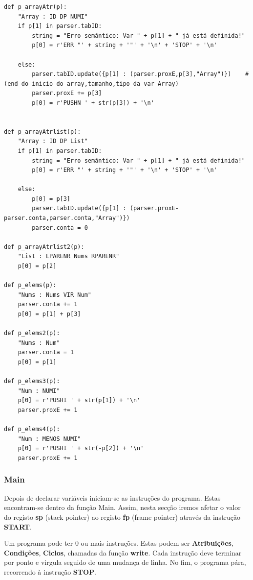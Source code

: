 \documentclass{article}
\begin{document}
\clearpage
\begin{lstlisting}[firstnumber=88]
def p_arrayAtr(p):
    "Array : ID DP NUMI"
    if p[1] in parser.tabID:
        string = "Erro semântico: Var " + p[1] + " já está definida!"
        p[0] = r'ERR "' + string + '"' + '\n' + 'STOP' + '\n'
    
    else:
        parser.tabID.update({p[1] : (parser.proxE,p[3],"Array")})    #(end do inicio do array,tamanho,tipo da var Array)
        parser.proxE += p[3]
        p[0] = r'PUSHN ' + str(p[3]) + '\n'


def p_arrayAtrlist(p):
    "Array : ID DP List"
    if p[1] in parser.tabID:
        string = "Erro semântico: Var " + p[1] + " já está definida!"
        p[0] = r'ERR "' + string + '"' + '\n' + 'STOP' + '\n'
    
    else:
        p[0] = p[3]
        parser.tabID.update({p[1] : (parser.proxE-parser.conta,parser.conta,"Array")})
        parser.conta = 0

def p_arrayAtrlist2(p):
    "List : LPARENR Nums RPARENR"
    p[0] = p[2]

def p_elems(p):
    "Nums : Nums VIR Num"
    parser.conta += 1
    p[0] = p[1] + p[3]

def p_elems2(p):
    "Nums : Num"
    parser.conta = 1
    p[0] = p[1]

def p_elems3(p):
    "Num : NUMI"
    p[0] = r'PUSHI ' + str(p[1]) + '\n'
    parser.proxE += 1

def p_elems4(p):
    "Num : MENOS NUMI"
    p[0] = r'PUSHI ' + str(-p[2]) + '\n'
    parser.proxE += 1
\end{lstlisting}
\clearpage


\subsubsection {Main}
\setlength{\parindent}{5ex}
Depois de declarar variáveis iniciam-se as instruções do programa. Estas encontram-se dentro da função Main. Assim, nesta secção iremos afetar o valor do registo \textbf{sp} (stack pointer) ao registo \textbf{fp} (frame pointer) através da instrução \textbf{START}. 
\par Um programa pode ter 0 ou mais instruções. Estas podem ser \textbf{Atribuições}, \textbf{Condições}, \textbf{Ciclos}, chamadas da função \textbf{write}. Cada instrução deve terminar por ponto e virgula seguido de uma mudança de linha. No fim, o programa pára, recorrendo à instrução \textbf{STOP}.
\end{document}
